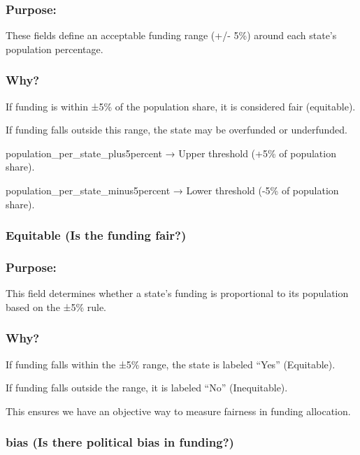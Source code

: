\documentclass[
]{article}
\begin{document}
\subsubsection{Purpose:}\label{purpose}

These fields define an acceptable funding range (+/- 5\%) around each
state's population percentage.

\subsubsection{Why?}\label{why}

If funding is within ±5\% of the population share, it is considered fair
(equitable).

If funding falls outside this range, the state may be overfunded or
underfunded.

population\_per\_state\_plus5percent → Upper threshold (+5\% of
population share).

population\_per\_state\_minus5percent → Lower threshold (-5\% of
population share).

\subsubsection{Equitable (Is the funding
fair?)}\label{equitable-is-the-funding-fair}

\subsubsection{Purpose:}\label{purpose-1}

This field determines whether a state's funding is proportional to its
population based on the ±5\% rule.

\subsubsection{Why?}\label{why-1}

If funding falls within the ±5\% range, the state is labeled ``Yes''
(Equitable).

If funding falls outside the range, it is labeled ``No'' (Inequitable).

This ensures we have an objective way to measure fairness in funding
allocation.

\subsubsection{bias (Is there political bias in
funding?)}\label{bias-is-there-political-bias-in-funding}
\end{document}

